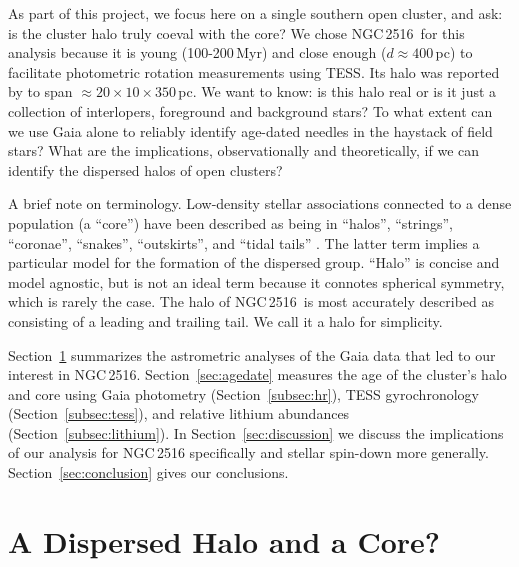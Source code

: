 \documentclass[12pt,twocolumn,tighten]{aastex63}
\newcommand{\cn}{NGC\,2516} %
\begin{document}
As part of this project, we focus here on a single southern open
cluster, and ask: is the cluster halo truly coeval with the core?  We
chose \cn\ for this analysis because it is young (100-200\,Myr) and
close enough ($d\approx400$\,pc) to facilitate photometric
rotation measurements using TESS.  Its halo was reported by
\citet{kounkel_untangling_2019} to span
$\approx20\times10\times350$\,pc.  We want to know: is this halo real
or is it just a collection of interlopers, foreground and background
stars?  To what extent can we use Gaia alone to reliably identify
age-dated needles in the haystack of field stars?  What are the
implications, observationally and theoretically, if we can identify
the dispersed halos of open clusters?

A brief note on terminology.  Low-density stellar associations
connected to a dense population (a ``core'') have been described as
being in ``halos'', ``strings'', ``coronae'', ``snakes'',
``outskirts'', and ``tidal tails'' \citep[{\it
e.g.},][]{davenport_death_2010,kounkel_untangling_2019,roser_hyades_2019,tian_discovery_2020,meingast_2021}.
The latter term implies a particular model for the formation of the
dispersed group.  ``Halo'' is concise and model agnostic, but is not
an ideal term because it connotes spherical symmetry, which is rarely
the case.  The halo of \cn\ is most accurately described as consisting
of a leading and trailing tail.  We call it a halo for simplicity.

Section~\ref{sec:gaia} summarizes the astrometric analyses of the Gaia
data that led to our interest in \cn.  Section~\ref{sec:agedate}
measures the age of the cluster's halo and core using Gaia photometry
(Section~\ref{subsec:hr}), TESS gyrochronology
(Section~\ref{subsec:tess}), and relative lithium abundances
(Section~\ref{subsec:lithium}).  In Section~\ref{sec:discussion} we
discuss the implications of our analysis for NGC\,2516 specifically
and stellar spin-down more generally.  Section~\ref{sec:conclusion}
gives our conclusions.


\section{A Dispersed Halo and a Core?}
\label{sec:gaia}
\end{document}
